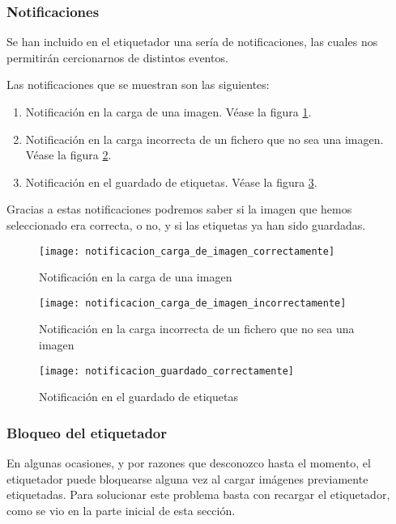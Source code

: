 \subsubsection{Notificaciones}

Se han incluido en el etiquetador una sería de notificaciones, las cuales nos permitirán cercionarnos de distintos eventos. 

Las notificaciones que se muestran son las siguientes:

\begin{enumerate}
	\item Notificación en la carga de una imagen. Véase la figura \ref{fig:E.4.8.1}.
	\item Notificación en la carga incorrecta de un fichero que no sea una imagen. Véase la figura \ref{fig:E.4.8.2}.
	\item Notificación en el guardado de etiquetas. Véase la figura \ref{fig:E.4.8.3}.
\end{enumerate}

Gracias a estas notificaciones podremos saber si la imagen que hemos seleccionado era correcta, o no, y si las etiquetas ya han sido guardadas.

\begin{figure}[h]
\centering
\texttt{[image: notificacion\_carga\_de\_imagen\_correctamente]}
\caption{Notificación en la carga de una imagen}
\label{fig:E.4.8.1}
\end{figure}

\begin{figure}[h]
\centering
\texttt{[image: notificacion\_carga\_de\_imagen\_incorrectamente]}
\caption{Notificación en la carga incorrecta de un fichero que no sea una imagen}
\label{fig:E.4.8.2}
\end{figure}

\begin{figure}[h]
\centering
\texttt{[image: notificacion\_guardado\_correctamente]}
\caption{Notificación en el guardado de etiquetas}
\label{fig:E.4.8.3}
\end{figure}

\subsubsection{Bloqueo del etiquetador}

En algunas ocasiones, y por razones que desconozco hasta el momento, el etiquetador puede bloquearse alguna vez al cargar imágenes previamente etiquetadas. Para solucionar este problema basta con recargar el etiquetador, como se vio en la parte inicial de esta sección.